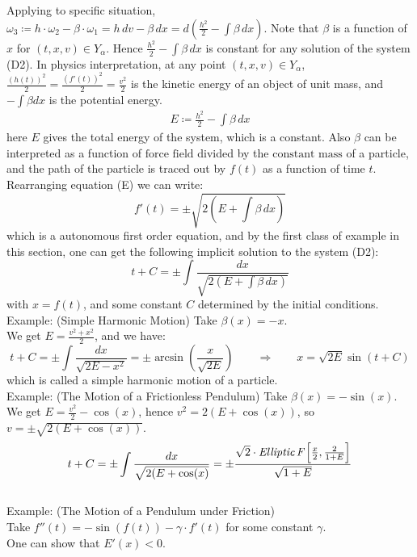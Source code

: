 \documentclass[15pt]{book}
\theoremstyle{break}
\theoremstyle{break}
\newcommand{\example}{\color{green}Example: \color{black}}
\begin{document}
\begin{enumerate}
Applying to specific situation, $\omega_3 \coloneqq h\cdot\omega_2 - \beta\cdot \omega_1 = h\,dv - \beta \, dx = d(\frac{h^2}{2} - \int \beta \, dx)$. Note that $\beta$ is a function of $x$ for $(t,x,v) \in Y_{\alpha}$. Hence $\frac{h^2}{2} - \int \beta \, dx$ is constant for any solution of the system (D2). In physics interpretation, at any point $(t,x,v) \in Y_{\alpha}$, $\frac{(h(t))^2}{2} =\frac{(f'(t))^2}{2} =  \frac{v^2}{2}$ is the kinetic energy of an object of unit mass, and $-\int \beta dx$ is the potential energy. 
\begin{align*}
E \coloneqq \frac{h^2}{2} - \int \beta \, dx
\tag{E}
\end{align*}
here $E$ gives the total energy of the system, which is a constant. Also $\beta$ can be interpreted as a function of $\text{force field}$ divided by the ${\text{constant mass}}$ of a particle, and the path of the particle is traced out by $f(t)$ as a function of time $t$. Rearranging equation (E) we can write:
$$f'(t) = \pm \sqrt{2\left(E+\int \beta\, dx\right)} $$
which is a autonomous first order equation, and by the first class of example in this section, one can get the following implicit solution to the system (D2):
$$t+C = \pm \int \frac{dx}{\sqrt{2(E+\int \beta \, dx)}}$$
with $x = f(t)$, and some constant $C$ determined by the initial conditions. \\

\example (Simple Harmonic Motion) Take $\beta(x) = -x$. \\
We get $E = \frac{v^2 + x^2}{2}$, and we have: $$t+C = \pm \int \frac{dx}{\sqrt{2E-x^2}} = \pm \arcsin\left(\frac{x}{\sqrt{2E}}\right) \qquad\Rightarrow\qquad x = \sqrt{2E} \sin(t+C)$$ which is called a simple harmonic motion of a particle. \\

\example (The Motion of a Frictionless Pendulum) Take $\beta(x) = -\sin(x)$. 
\\We get $E = \frac{v^2}{2}-\cos(x)$, hence $v^2 = 2(E+\cos(x))$, so $v = \pm \sqrt{2(E+\cos(x))}$.
$$t+C = \pm \int \frac{dx}{\sqrt{2(E+\cos(x)}} = \pm \frac{\sqrt{2}\cdot  \textit{Elliptic\,F}\left[ \frac{x}{2}, \frac{2}{1+E}\right]}{\sqrt{1+E}}$$\\

\example (The Motion of a Pendulum under Friction) \\Take $f''(t) = -\sin(f(t)) -\gamma \cdot f'(t)$ for some constant $\gamma$. \\
One can show that $E'(x) <0$. 
\end{enumerate}
\end{document}
